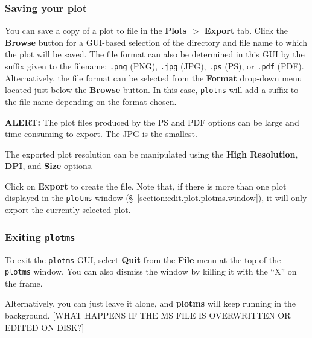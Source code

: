 \subsubsection{Saving your plot}
\label{section:edit.plot.plotms.save}

You can save a copy of a plot to file in the {\bf Plots $>$ Export} tab. Click the {\bf Browse} button for a GUI-based selection of the directory and file name to which the plot will be saved. The file format can also be determined in this GUI by the suffix given to the filename: {\tt .png} (PNG), {\tt .jpg} (JPG), {\tt .ps} (PS), or {\tt .pdf} (PDF). Alternatively, the file format can be selected from the {\bf Format} drop-down menu located just below the {\bf Browse} button. In this case, {\tt plotms} will add a suffix to the file name depending on the format chosen.

{\bf ALERT:} The plot files produced by the PS and PDF options can be large and time-consuming to export.  The JPG is the smallest.

The exported plot resolution can be manipulated using the {\bf High Resolution}, {\bf DPI}, and {\bf Size} options.

Click on {\bf Export} to create the file. Note that, if there is more than one plot displayed in the {\tt plotms} window (\S~\ref{section:edit.plot.plotms.window}), it will only export the currently selected plot.

\subsubsection{Exiting {\tt plotms}}
\label{section:edit.plot.plotms.exit}

To exit the {\tt plotms} GUI, select {\bf Quit} from the {\bf File} menu at the top of the {\tt plotms} window. You can also dismiss the window by killing it with the ``X'' on the frame.

Alternatively, you can just leave it alone, and {\bf plotms} will keep running in the background. [WHAT HAPPENS IF THE MS FILE IS OVERWRITTEN OR EDITED ON DISK?]








